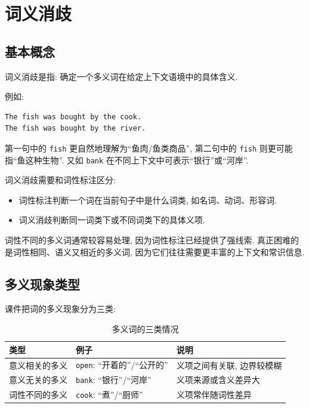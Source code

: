 \section{词义消歧}


\subsection{基本概念}


词义消歧是指:
确定一个多义词在给定上下文语境中的具体含义.

例如:

\begin{Verbatim}[breaklines=true,breakanywhere=true,fontsize=\small]
The fish was bought by the cook.
The fish was bought by the river.
\end{Verbatim}

第一句中的 \texttt{fish} 更自然地理解为“鱼肉/鱼类商品”,
第二句中的 \texttt{fish} 则更可能指“鱼这种生物”.
又如 \texttt{bank} 在不同上下文中可表示“银行”或“河岸”.

词义消歧需要和词性标注区分:

\begin{itemize}
\item 词性标注判断一个词在当前句子中是什么词类, 如名词、动词、形容词.
\item 词义消歧判断同一词类下或不同词类下的具体义项.
\end{itemize}

词性不同的多义词通常较容易处理, 因为词性标注已经提供了强线索.
真正困难的是词性相同、语义又相近的多义词, 因为它们往往需要更丰富的上下文和常识信息.

\subsection{多义现象类型}


课件把词的多义现象分为三类:

\begin{table}[H]
\centering
\begingroup
\setlength{\tabcolsep}{2pt}
\small
\caption{多义词的三类情况}
\begin{tabular}{|p{}|p{}|p{}|}
\hline
类型 & 例子 & 说明 \\ \hline
意义相关的多义 & \texttt{open}: “开着的”/“公开的” & 义项之间有关联, 边界较模糊 \\ \hline
意义无关的多义 & \texttt{bank}: “银行”/“河岸” & 义项来源或含义差异大 \\ \hline
词性不同的多义 & \texttt{cook}: “煮”/“厨师” & 义项常伴随词性差异 \\ \hline
\end{tabular}
\endgroup
\end{table}

